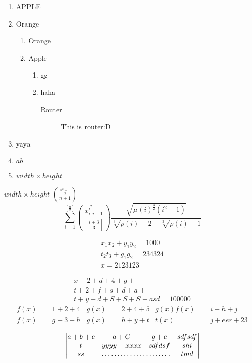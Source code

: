 \documentclass{article}
\begin{document}
  \begin{enumerate}
    \item APPLE
    \item Orange
    \begin{enumerate}
      \item Orange
      \item Apple
      \begin{enumerate}
        \item gg
        \item haha
        \begin{description}
          \item [Router] This is router:D
        \end{description}
      \end{enumerate}
    \end{enumerate}
    \item yaya
    \item $a         b$
    \item $width \times height$
  \end{enumerate}
  $\mathit{width} \times \mathit{height}$
  $\binom{\frac{n^2-1}{2}}{n+1}$
  \begin{equation}
    \displaystyle{\sum_{i=1}^{[\frac{n}{2}]}\binom{x^{i^2}_{i,i+1}}{[\frac{i+3}{3}]}\frac{\sqrt{\mu(i)^{\frac{3}{2}}(i^2-1)}}{\sqrt[3]{\rho(i)-2}+\sqrt[3]{\rho(i)-1}}}
  \end{equation}

  \begin{gather}
    x_1x_2 + y_1y_2 = 1000\\
    t_2t_3 + g_1g_2 = 234324 \nonumber\\
    x = 2123123
  \end{gather}

  \begin{multline}
    x + 2 + d + 4 + g +\\
    t+2+f+s+d+a+\\
    t + y + d +S +S +S-asd = 100000
  \end{multline}
  \begin{align*}
    f(x) &= 1 + 2 + 4 & g(x) &= 2 + 4 + 5  & g(x)f(x) &= i + h + j\\
    f(x) &= g + 3 + h & g(x) &= h + y + t  & t(x) &= j + eer+ 23
  \end{align*}

  \begin{equation*}
    \left|\left|
      \begin{matrix}
        a+b+c & a+C & g+c & sdfsdf\\
        t & yyyy +xxxx & sdfdsf & shi\\
        ss & \hdotsfor{2}  & tmd\\
      \end{matrix}
    \right|\right|
  \end{equation*}
\end{document}
